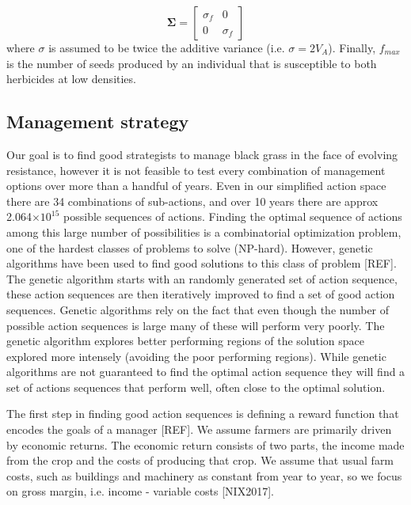 \documentclass[12pt, a4paper]{article}
\begin{document}
\begin{equation}
	\mathbf{\Sigma} = \begin{bmatrix}
		\sigma_f & 0\\
		0 & \sigma_f
	\end{bmatrix}
\end{equation}
where $\sigma$ is assumed to be twice the additive variance (i.e. $\sigma = 2V_A$). Finally, $f_{max}$ is the number of seeds produced by an individual that is susceptible to both herbicides at low densities.   

\subsection*{Management strategy}
Our goal is to find good strategists to manage black grass in the face of evolving resistance, however it is not feasible to test every combination of management options over more than a handful of years. Even in our simplified action space there are 34 combinations of sub-actions, and over 10 years there are approx 2.064$\times 10^{15}$ possible sequences of actions. Finding the optimal sequence of actions among this large number of possibilities is a combinatorial optimization problem, one of the hardest classes of problems to solve (NP-hard). However, genetic algorithms have been used to find good solutions to this class of problem [REF]. The genetic algorithm starts with an randomly generated set of action sequence, these action sequences are then iteratively improved to find a set of good action sequences. Genetic algorithms rely on the fact that even though the number of possible action sequences is large many of these will perform very poorly. The genetic algorithm explores better performing regions of the solution space explored more intensely (avoiding the poor performing regions). While genetic algorithms are not guaranteed to find the optimal action sequence they will find a set of actions sequences that perform well, often close to the optimal solution.   

The first step in finding good action sequences is defining a reward function that encodes the goals of a manager [REF]. We assume farmers are primarily driven by economic returns. The economic return consists of two parts, the income made from the crop and the costs of producing that crop. We assume that usual farm costs, such as buildings and machinery as constant from year to year, so we focus on gross margin, i.e. income - variable costs [NIX2017].
\end{document}
